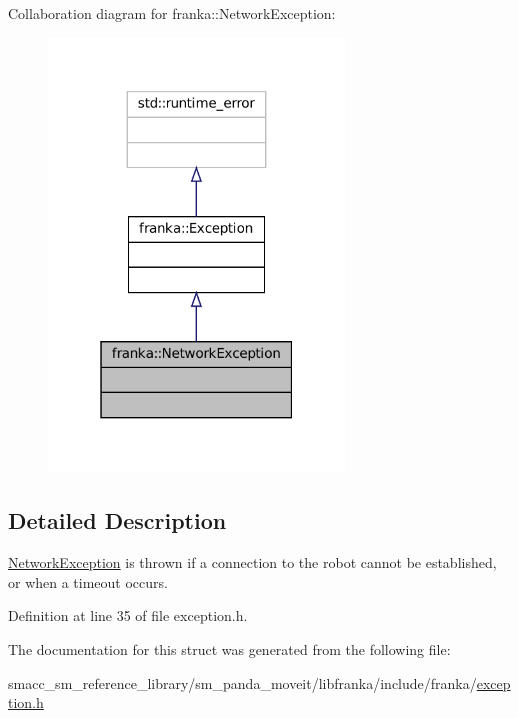 Collaboration diagram for franka\+:\+:Network\+Exception\+:
\nopagebreak
\begin{figure}[H]
\begin{center}
\leavevmode
\includegraphics[width=223pt]{structfranka_1_1NetworkException__coll__graph}
\end{center}
\end{figure}


\subsection{Detailed Description}
\hyperlink{structfranka_1_1NetworkException}{Network\+Exception} is thrown if a connection to the robot cannot be established, or when a timeout occurs. 

Definition at line 35 of file exception.\+h.



The documentation for this struct was generated from the following file\+:\begin{DoxyCompactItemize}
\item 
smacc\+\_\+sm\+\_\+reference\+\_\+library/sm\+\_\+panda\+\_\+moveit/libfranka/include/franka/\hyperlink{exception_8h}{exception.\+h}\end{DoxyCompactItemize}
